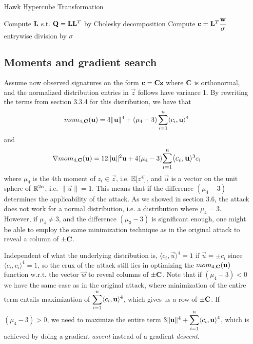 \begin{algorithm}
\caption{Hawk Hypercube Transformation}
\begin{algorithmic}[1]
    \State Compute $\mathbf{L}$ s.t. $\mathbf{Q} = \mathbf{L}\mathbf{L}^T$ \Comment by Cholesky decomposition
    \State Compute $\vec{c} = \mat{L}^T \mathlarger{\frac{\vec{w}}{\sigma}}$ \Comment entrywise division by $\sigma$
    \State {}
\end{algorithmic}
\end{algorithm}

\subsection{Moments and gradient search}
Assume now observed signatures on the form $\mathbf{c} = \mathbf{C} \mathbf{z}$ where $\mathbf{C}$ is orthonormal, and the normalized distribution entries in $\vec{z}$ follows have variance 1. 
By rewriting the terms from section 3.3.4 for this distribution, we have that
\[mom_{4, \mathbf{C}} (\mathbf{u}) = 3 \lVert \mathbf{u} \rVert ^4 + (\mu_4 - 3) \sum_{i=1}^{n} \langle c_i, \mathbf{u} \rangle^4 \]
and
\[\nabla mom_{4, \mat{C}} (\vec{u}) = 12 \lVert \vec{u} \rVert^2 \vec{u} + 4(\mu_4 - 3) \mathlarger{\sum_{i=1}^{n} \langle c_i, \vec{u}} \rangle^3 c_i\]
where $\mu_4$ is the 4th moment of $z_i \in \vec{z}$, i.e. $\mathbb{E}[z^4]$, and $\vec{u}$ is a vector on the unit sphere of $\mathbb{R}^{2n}$, i.e. $\lVert \vec{u} \rVert = 1$. 
This means that if the difference $(\mu_4 - 3)$ determines the applicability of the attack. 
As we showed in section 3.6, the attack does not work for a normal distribution, i.e. a distribution where $\mu_4 = 3$.
However, if $\mu_4 \neq 3$, and the difference $(\mu_3 - 3)$ is significant enough, one might be able to employ the same minimization technique 
as in the original attack to reveal a column of $\pm \mathbf{C}$.

Independent of what the underlying distribution is, $\langle c_i, \vec{u} \rangle^4 = 1$ if $\vec{u} = \pm c_i$ since $\langle c_i, c_i \rangle^4 = 1$, so the crux of the attack still lies in
optimizing the $mom_{4, \mathbf{C}}(\mathbf{u})$ function w.r.t. the vector $\vec{w}$ to reveal columns of $\pm \mathbf{C}$.
Note that if $(\mu_4 - 3) < 0$ we have the same case as in the original attack, where minimization of the entire term entails maximization of $\mathlarger{\sum_{i=1}^{n} \langle c_i, \vec{u} \rangle^4}$, which gives us a row of $\pm \mathbf{C}$.
If $(\mu_4 - 3) > 0$, we need to maximize the entire term $3 \lVert \vec{u} \rVert ^4 + \mathlarger{\sum_{i=1}^{n} \langle c_i, \vec{u} \rangle^4}$, which is achieved by doing a gradient \textit{ascent} instead of a gradient \textit{descent}.

